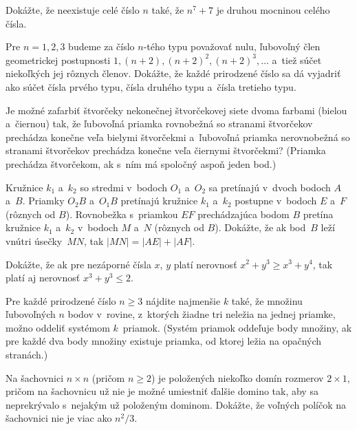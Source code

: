 {%
Dokážte, že neexistuje celé číslo $n$ také, že $n^7+7$ je druhou mocninou celého čísla.}

{%
Pre $n = 1, 2, 3$ budeme za číslo $n$-tého typu považovať nulu, ľubovoľný člen geometrickej postupnosti $1,(n+2),(n+2)^2,(n+2)^3,\dots$ a~tiež súčet niekoľkých jej rôznych členov. Dokážte, že každé prirodzené číslo sa dá vyjadriť ako súčet čísla prvého typu, čísla druhého typu a~čísla tretieho typu.}

{%
Je možné zafarbiť štvorčeky nekonečnej štvorčekovej siete dvoma farbami (bielou a~čiernou) tak, že ľubovoľná priamka rovnobežná so stranami štvorčekov prechádza konečne veľa bielymi štvorčekmi a~ľubovoľná priamka nerovnobežná so stranami štvorčekov prechádza konečne veľa čiernymi štvorčekmi? (Priamka prechádza štvorčekom, ak s~ním má spoločný aspoň jeden bod.)}

{%
Kružnice $k_1$ a~$k_2$ so stredmi v~bodoch $O_1$ a~$O_2$ sa pretínajú v~dvoch bodoch $A$ a~$B$. Priamky $O_2B$ a~$O_1B$ pretínajú kružnice $k_1$ a~$k_2$ postupne v~bodoch $E$ a~$F$ (rôznych od $B$). Rovnobežka s~priamkou $EF$ prechádzajúca bodom $B$ pretína kružnice $k_1$ a~$k_2$ v~bodoch $M$ a~$N$ (rôznych od $B$). Dokážte, že ak bod~$B$ leží vnútri úsečky~$MN$, tak $|MN|=|AE|+|AF|$.}

{%
Dokážte, že ak pre nezáporné čísla $x$, $y$ platí nerovnosť $x^2+y^3\ge x^3+y^4$, tak platí aj nerovnosť $x^3+y^3\le 2$.}

{%
Pre každé prirodzené číslo $n \ge 3$ nájdite najmenšie $k$ také, že množinu ľubovoľných $n$ bodov v~rovine, z~ktorých žiadne tri neležia na jednej priamke, možno oddeliť systémom $k$~priamok. (Systém priamok oddeľuje body množiny, ak pre každé dva body množiny existuje priamka, od ktorej ležia na opačných stranách.)}

{%
Na šachovnici $n \times n$ (pričom $n\ge2$) je položených niekoľko domín rozmerov $2 \times 1$, pričom na šachovnicu
už nie je možné umiestniť ďalšie domino tak, aby sa neprekrývalo s~nejakým už položeným
dominom. Dokážte, že voľných políčok na šachovnici nie je viac ako $n^2/3$.
}

